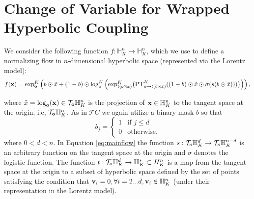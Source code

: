 \section{Change of Variable for Wrapped Hyperbolic Coupling}
\label{wrapped_coupling_proof_appendix}
We consider the following function $f : \mathbb{H}^n_K \rightarrow \mathbb{H}^n_K$, which we use to define a normalizing flow in $n$-dimensional hyperbolic space (represented via the Lorentz model): 
\begin{equation}\label{eq:mainflow}
    f(\mathbf{x}) = \textnormal{exp}^K_{\textbf{o}}\left( b \odot \tilde{
    x} + (1-b) \odot \log^K_{\textbf{o}}\Big( \textnormal{exp}^K_{t(b \odot \tilde{x})}\big(\textnormal{PT}^K_{\textbf{o}\to t(b \odot \tilde{x}) }((1-b) \odot \tilde{x} \odot \sigma(s(b \odot \tilde{x})))\big)\Big) \right),
\end{equation}

where $\tilde{x} = \log_{\mathbf{o}}(\mathbf{x}) \in \mathcal{T}_{\mathbf{o}}\mathbb{H}^n_K$ is the projection of $\mathbf{x} \in \mathbb{H}^n_K$ to the tangent space at the origin, i.e, $\mathcal{T}_{\mathbf{o}}\mathbb{H}^n_K$. As in $\mathcal{T}C$ we again utilize a binary mask $b$ so that
$$ 
b_j = 
\begin{cases}
1 &\textrm{if $j\leq d$}\\
0 &\textrm{otherwise},
\end{cases}
$$
where $0 < d < n$.
In Equation \eqref{eq:mainflow} the function $s : \mathcal{T}_o\mathbb{H}^d_K \rightarrow \mathcal{T}_o\mathbb{H}^{n-d}_K$ is an arbitrary function on the tangent space at the origin and $\sigma$ denotes the logistic function.
The function $t : \mathcal{T}_o\mathbb{H}^d_K \rightarrow \mathbb{H}^*_K \subset {H}^n_K$ is a map from the tangent space at the origin to a subset of hyperbolic space defined by the set of points satisfying the condition that $\mathbf{v}_i = 0, \forall i=2...d, \mathbf{v}_i \in \mathbb{H}^n_K$ (under their representation in the Lorentz model).

